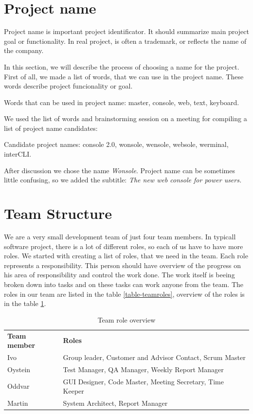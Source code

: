 \section{Project name}
Project name is important project identificator. It should summarize main project goal or functionality. In real project, is often a trademark, or reflects the name of the company.

In this section, we will describe the process of choosing a name for the project. First of all, we made a list of words, that we can use in the project name. These words describe project funcionality or goal.

Words that can be used in project name: master, console, web, text, keyboard.

We used the list of words and brainstorming session on a meeting for compiling a list of project name candidates:

Candidate project names: console 2.0, wonsole, wensole, websole, werminal, interCLI.

After discussion we chose the name \emph{Wonsole}. Project name can be sometimes little confusing, so we added the subtitle: \emph{The new web console for power users.}


\section{Team Structure}
We are a very small development team of just four team members. In typicall software project, there is a lot of different roles, so each of us have to have more roles. We started with creating a list of roles, that we need in the team. Each role represents a responsibility. This person should have overview of the progress on his area of responsibility and control the work done. The work itself is beeing broken down into tasks and on these tasks can work anyone from the team. The roles in our team are listed in the table \ref{table-teamroles}, overview of the roles is in the table \ref{table-rolesoverview}.

\begin{table}
\centering
\begin{tabular}{ l  l }
  \hline
  \textbf{Team member} & \textbf{Roles} \\
  Ivo & Group leader, Customer and Advisor Contact, Scrum Master \\
  Oystein & Test Manager, QA Manager, Weekly Report Manager \\
  Oddvar & GUI Designer, Code Master, Meeting Secretary, Time Keeper \\
  Martin & System Architect, Report Manager \\
  \hline
\end{tabular}
\label{table-rolesoverview}
\caption{Team role overview}
\end{table}


